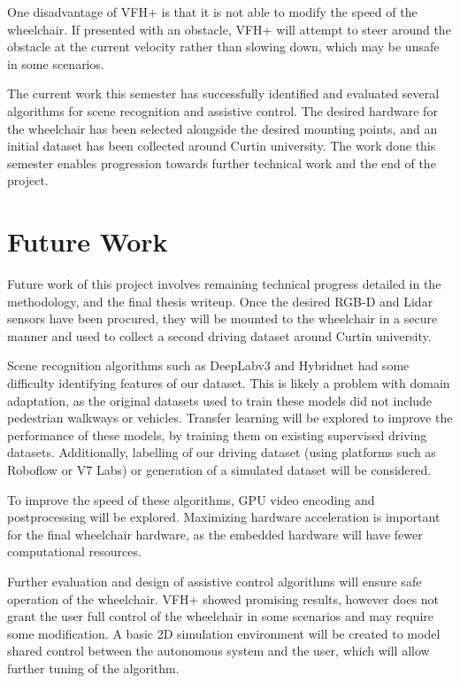 \documentclass[12pt]{article}
\begin{document}
One disadvantage of VFH+ is that it is not able to modify the speed of the wheelchair.
If presented with an obstacle, VFH+ will attempt to steer around the obstacle at the current velocity rather than
slowing down, which may be unsafe in some scenarios.

The current work this semester has successfully identified and evaluated several algorithms for scene recognition and assistive control.
The desired hardware for the wheelchair has been selected alongside the desired mounting points, and an initial dataset has
been collected around Curtin university.
The work done this semester enables progression towards further technical work and the end of the project.

\pagebreak





\section{Future Work}
Future work of this project involves remaining technical progress detailed in the methodology,
and the final thesis writeup.
Once the desired RGB-D and Lidar sensors have been procured, they will be mounted to the wheelchair
in a secure manner and used to collect a second driving dataset around Curtin university.

Scene recognition algorithms such as DeepLabv3 and Hybridnet
had some difficulty identifying features of our dataset. This is likely a problem with domain adaptation,
as the original datasets used to train these models did not include pedestrian walkways or vehicles.
Transfer learning will be explored to improve the performance of these
models, by training them on existing supervised driving datasets.
Additionally, labelling of our driving dataset (using platforms such as Roboflow or V7 Labs)
or generation of a simulated dataset will be considered.

To improve the speed of these algorithms, GPU video encoding and postprocessing will be explored.
Maximizing hardware acceleration is important for the final wheelchair hardware, as the embedded hardware will have fewer
computational resources.

Further evaluation and design of assistive control algorithms will ensure safe operation of the wheelchair.
VFH+ showed promising results, however does not grant the user full control of the wheelchair
in some scenarios and may require some modification. A basic 2D simulation environment will be created
to model shared control between the autonomous system and the user, which will allow further tuning
of the algorithm.
\end{document}
